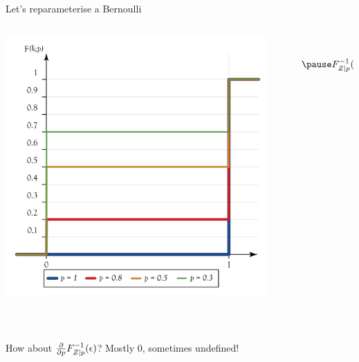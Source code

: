 \begin{frame}{Let's reparameterise a Bernoulli}

	\begin{columns}
	\begin{column}{0.35\textwidth}
	\includegraphics[scale=0.15]{bernoulli-cdf}
	\end{column}
	~
	\begin{column}{0.45\textwidth}
	\begin{equation*}
		\begin{aligned}
			Z &\sim \Bernoulli(p) \\ \pause
			\inv{F}_{Z|p}(\epsilon) &= 
			\begin{cases}
			0 &\text{if }\epsilon < 1 - p \\
			1 &\text{otherwise}
			\end{cases}
		\end{aligned}
	\end{equation*}
	\end{column}

	\end{columns}
	
	~
	
	\pause
	
	How about $\pdv{p}\inv{F}_{Z|p}(\epsilon)$? \pause \alert{Mostly $0$, sometimes undefined!}
	
\end{frame}

